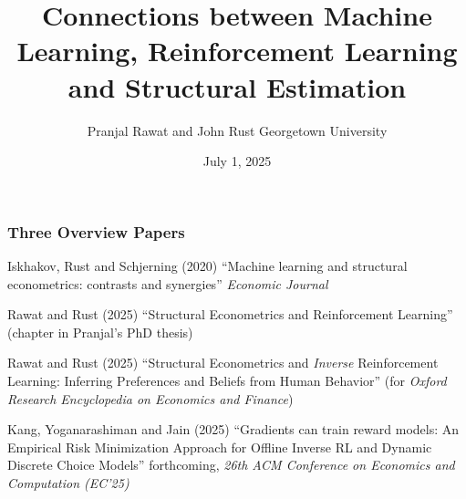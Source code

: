 \documentclass[10pt,english,t,handout]{beamer}
\begin{document}

\title[ML, RL and SE]{Connections between Machine Learning, Reinforcement Learning and Structural Estimation}
\author[Rawat and Rust]{Pranjal Rawat and John Rust Georgetown University}
\date{July 1, 2025}



\frame{\titlepage} 

\begin{frame} \frametitle{Three Overview Papers}
\bi
\item Iskhakov, Rust and Schjerning (2020) ``Machine learning and structural econometrics: contrasts and synergies'' {\it Economic Journal\/}
\item Rawat and Rust (2025) ``Structural Econometrics and Reinforcement Learning'' (chapter in Pranjal's PhD thesis)
\item Rawat and Rust (2025) ``Structural Econometrics and {\it Inverse\/} Reinforcement Learning: Inferring Preferences and Beliefs from Human Behavior''
(for {\it Oxford Research Encyclopedia on Economics and Finance\/})
\ei
\bigskip
{}
\medskip
\bi
\item   Kang, Yoganarashiman and Jain (2025) ``Gradients can train reward models:
An Empirical Risk Minimization Approach for
Offline Inverse RL and Dynamic Discrete Choice Models''  forthcoming, {\it 26th ACM Conference on Economics and Computation (EC'25)}
\ei
\end{frame}
\end{document}
